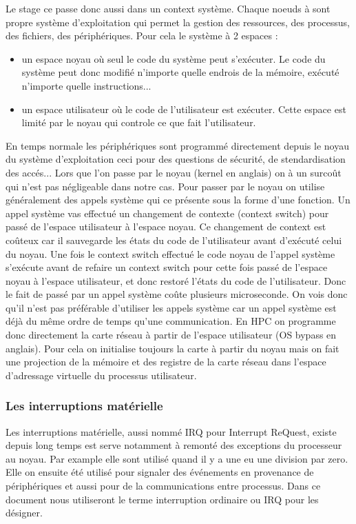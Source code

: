 Le stage ce passe donc aussi dans un context système.
Chaque noeuds à sont propre système d'exploitation qui permet la gestion des ressources, des processus, des fichiers, des périphériques.
Pour cela le système à 2 espaces :
\begin{itemize}
  \item un espace noyau où seul le code du système peut s'exécuter. Le code du système peut donc modifié n'importe quelle endrois de la mémoire, exécuté n'importe quelle instructions...
  \item un espace utilisateur où le code de l'utilisateur est exécuter. Cette espace est limité par le noyau qui controle ce que fait l'utilisateur.
\end{itemize}

En temps normale les périphériques sont programmé directement depuis le noyau du système d'exploitation ceci pour des questions de sécurité, de stendardisation des accés...
Lors que l'on passe par le noyau (kernel en anglais) on à un surcoût qui n'est pas négligeable dans notre cas.
Pour passer par le noyau on utilise généralement des appels système qui ce présente sous la forme d'une fonction.
Un appel système vas effectué un changement de contexte (context switch) pour passé de l'espace utilisateur à l'espace noyau.
Ce changement de context est coûteux car il sauvegarde les états du code de l'utilisateur avant d'exécuté celui du noyau.
Une fois le context switch effectué le code noyau de l'appel système s'exécute avant de refaire un context switch pour cette fois passé de l'espace noyau à l'espace utilisateur, et donc restoré l'états du code de l'utilisateur.
Donc le fait de passé par un appel système coûte plusieurs microseconde.
On vois donc qu'il n'est pas préférable d'utiliser les appels système car un appel système est déjà du même ordre de temps qu'une communication.
En HPC on programme donc directement la carte réseau à partir de l'espace utilisateur (OS bypass en anglais).
Pour cela on initialise toujours la carte à partir du noyau mais on fait une projection de la mémoire et des registre de la carte réseau dans l'espace d'adressage virtuelle du processus utilisateur.

\subsubsection{Les interruptions matérielle}

Les interruptions matérielle, aussi nommé IRQ pour Interrupt ReQuest, existe depuis long temps est serve notamment à remonté des exceptions du processeur au noyau.
Par example elle sont utilisé quand il y a une eu une division par zero.
Elle on ensuite été utilisé pour signaler des événements en provenance de périphériques et aussi pour de la communications entre processus.
Dans ce document nous utiliseront le terme interruption ordinaire ou IRQ pour les désigner.

